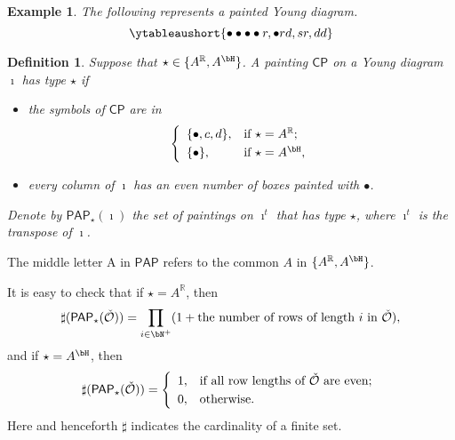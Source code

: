 \documentclass[12pt]{amsart}
\let\ytb=\ytableaushort
\newcommand{\CO}{{\mathcal {O}}}
\newcommand{\CP}{{\mathcal {P}}}
\newcommand{\R}{\mathbb R}
\numberwithin{equation}{section}
\newtheorem{defn}[thm]{Definition}
\newtheorem{eg}[thm]{Example}
\theoremstyle{remark}
\newtheorem{remark}[thm]{Remark}
\def\CP{\mathsf{CP}}
\def\PAP{\mathsf{PAP}}
\begin{document}


\begin{eg}
  The following represents a painted Young diagram.
   \[ \ytb{\bullet\bullet\bullet\bullet r,\bullet r d , sr,dd}
  \]
\end{eg}

\begin{defn}\label{defpbp0}
  Suppose that $\star\in \{A^\R, A^\bH\}$. A painting $\CP$ on a Young diagram $\imath$ has type $\star$ if
  \begin{itemize}
    \item the symbols of $\CP$ are in
          \[
          \left\{
          \begin{array}{ll}
            \{\bullet, c, d\}, &\hbox{if $\star=A^\R$}; \smallskip\\
            \{\bullet\}, &\hbox{if $\star=A^\bH$},                    \end{array}
        \right.
          \]
    \item every column of $\imath$ has an even number of boxes painted with $\bullet$.
          \end{itemize}
  Denote by $\PAP_\star(\imath)$ the set of paintings on $\imath^{t}$ that has type $\star$, where $\imath^{t}$
  is the transpose of $\imath$.
   \end{defn}


The middle letter $\mathrm A$ in $\PAP$ refers to the common $A$ in $\{A^\R, A^\bH\}$.

It is easy to check that if $\star=A^\R$, then
  \[
    \sharp(\PAP_\star(\check \CO))=\prod_{i\in \bN^+} (1+\textrm{the
      number of rows of length $i$ in $\check \CO$}),
  \]
  and if $\star=A^\bH$, then
  \[
    \sharp(\PAP_\star(\check \CO))= \left\{
      \begin{array}{ll}
        1, &\hbox{if all row lengths of $\check \CO$ are even}; \smallskip\\
        0, &\hbox{otherwise}.  \end{array}
    \right.
  \]
Here and henceforth $\sharp$ indicates the cardinality of a finite set.
\end{document}
